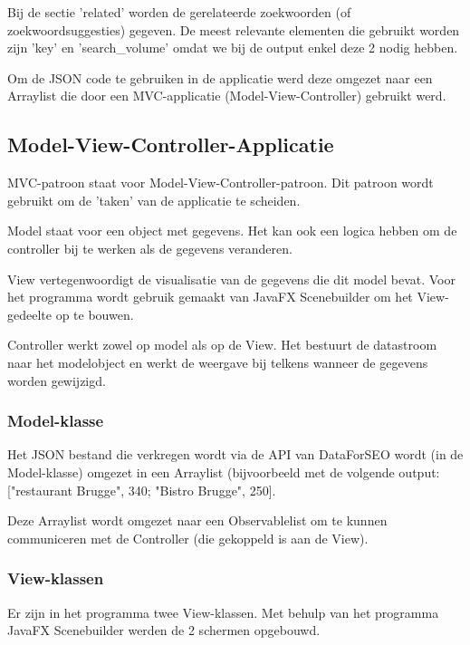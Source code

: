 Bij de sectie 'related' worden de gerelateerde zoekwoorden (of zoekwoordsuggesties) gegeven. De meest relevante elementen die gebruikt worden zijn 'key' en 'search\_volume' omdat we bij de output enkel deze 2 nodig hebben. 

Om de JSON code te gebruiken in de applicatie werd deze omgezet naar een Arraylist die door een MVC-applicatie (Model-View-Controller) gebruikt werd. 

\subsection{Model-View-Controller-Applicatie}
\label{ch: Model-View-Controller-Applicatie}

MVC-patroon staat voor Model-View-Controller-patroon. Dit patroon wordt gebruikt om de 'taken' van de applicatie te scheiden. 

Model staat voor een object met gegevens. Het kan ook een logica hebben om de controller bij te werken als de gegevens veranderen. 

View vertegenwoordigt de visualisatie van de gegevens die dit model bevat. Voor het programma wordt gebruik gemaakt van JavaFX Scenebuilder om het View-gedeelte op te bouwen. 

Controller werkt zowel op model als op de View. Het bestuurt de datastroom naar het modelobject en werkt de weergave bij telkens wanneer de gegevens worden gewijzigd.

\subsubsection{Model-klasse}
\label{ch: Model-klasse}

Het JSON bestand die verkregen wordt via de API van DataForSEO wordt (in de Model-klasse) omgezet in een Arraylist (bijvoorbeeld met de volgende output: ["restaurant Brugge", 340; "Bistro Brugge", 250].

Deze Arraylist wordt omgezet naar een Observablelist om te kunnen communiceren met de Controller (die gekoppeld is aan de View). 

\subsubsection{View-klassen}
\label{ch: View-klassen}

Er zijn in het programma twee View-klassen. Met behulp van het programma JavaFX Scenebuilder werden de 2 schermen opgebouwd.

